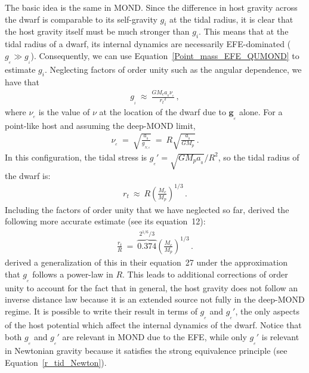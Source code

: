 \documentclass[fleqn,usenatbib,useAMS,onecolumn]{mnras} %
\begin{document}
The basic idea is the same in MOND. Since the difference in host gravity across the dwarf is comparable to its self-gravity $g_i$ at the tidal radius, it is clear that the host gravity itself must be much stronger than $g_i$. This means that at the tidal radius of a dwarf, its internal dynamics are necessarily EFE-dominated ($g_{_e} \gg g_{_i}$). Consequently, we can use Equation~\ref{Point_mass_EFE_QUMOND} to estimate $g_i$. Neglecting factors of order unity such as the angular dependence, we have that
\begin{eqnarray}
	g_{_i} ~\approx~ \frac{GM_c a_{_0}\nu_{_e}}{{r_t}^2} \, ,
\end{eqnarray}
where $\nu_{_e}$ is the value of $\nu$ at the location of the dwarf due to $\bm{g}_{_e}$ alone. For a point-like host and assuming the deep-MOND limit,
\begin{eqnarray}
	\nu_{_e} ~=~ \sqrt{\frac{a_{_0}}{g_{_{N,e}}}} ~=~ R\sqrt{\frac{a_{_0}}{GM_p}} \, .
\end{eqnarray}
In this configuration, the tidal stress is $g_{_e}' = \sqrt{GM_p a_{_0}}/R^2$, so the tidal radius of the dwarf is:
\begin{eqnarray}
	r_t ~\approx~ R \left(\frac{M_c}{M_p} \right)^{1/3} \, .
\end{eqnarray}
Including the factors of order unity that we have neglected so far, \citet{Zhao_2005} derived the following more accurate estimate (see its equation~12):
\begin{eqnarray}
	\frac{r_t}{R} ~=~ \overbrace{0.374}^{2^{1/6}/3} \left(\frac{M_c}{M_p}\right)^{1/3} \, .
	\label{r_tid_DML}
\end{eqnarray}
\citet{Zhao_2006} derived a generalization of this in their equation~27 under the approximation that $g_{_e}$ follows a power-law in $R$. This leads to additional corrections of order unity to account for the fact that in general, the host gravity does not follow an inverse distance law because it is an extended source not fully in the deep-MOND regime. It is possible to write their result in terms of $g_{_e}$ and $g_{_e}'$, the only aspects of the host potential which affect the internal dynamics of the dwarf. Notice that both $g_{_e}$ and $g_{_e}'$ are relevant in MOND due to the EFE, while only $g_{_e}'$ is relevant in Newtonian gravity because it satisfies the strong equivalence principle (see Equation~\ref{r_tid_Newton}).
\end{document}
